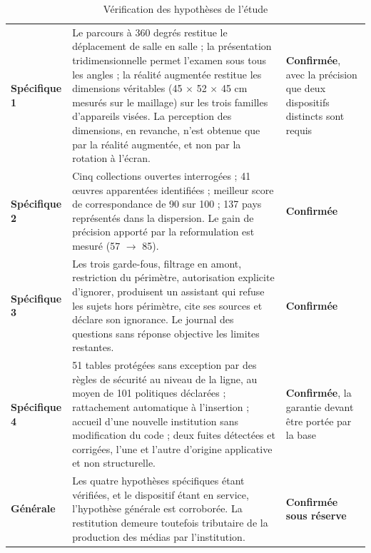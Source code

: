 \begin{table}[htbp]
\centering
\caption{Vérification des hypothèses de l'étude}
\label{tab:hypotheses}
\footnotesize
\begin{tabularx}{\textwidth}{|C{2.1cm}|X|C{2.6cm}|}
\hline
{}
 &  &  \\ \hline
\textbf{Spécifique 1} &
Le parcours à 360 degrés restitue le déplacement de salle en salle ; la
présentation tridimensionnelle permet l'examen sous tous les angles ; la réalité
augmentée restitue les dimensions véritables (45 $\times$ 52 $\times$ 45 cm
mesurés sur le maillage) sur les trois familles d'appareils visées. La
perception des dimensions, en revanche, n'est obtenue que par la réalité
augmentée, et non par la rotation à l'écran. &
\textbf{Confirmée}, avec la précision que deux dispositifs distincts sont
requis \\ \hline
\textbf{Spécifique 2} &
Cinq collections ouvertes interrogées ; 41 œuvres apparentées identifiées ;
meilleur score de correspondance de 90 sur 100 ; 137 pays représentés dans la
dispersion. Le gain de précision apporté par la reformulation est mesuré
(57 $\rightarrow$ 85). &
\textbf{Confirmée} \\ \hline
\textbf{Spécifique 3} &
Les trois garde-fous, filtrage en amont, restriction du périmètre, autorisation
explicite d'ignorer, produisent un assistant qui refuse les sujets hors
périmètre, cite ses sources et déclare son ignorance. Le journal des questions
sans réponse objective les limites restantes. &
\textbf{Confirmée} \\ \hline
\textbf{Spécifique 4} &
51 tables protégées sans exception par des règles de sécurité au niveau de la ligne, au moyen de 101 politiques déclarées ;
rattachement automatique à l'insertion ; accueil d'une nouvelle institution sans
modification du code ; deux fuites détectées et corrigées, l'une et l'autre
d'origine applicative et non structurelle. &
\textbf{Confirmée}, la garantie devant être portée par la base \\ \hline
\textbf{Générale} &
Les quatre hypothèses spécifiques étant vérifiées, et le dispositif étant en
service, l'hypothèse générale est corroborée. La restitution demeure toutefois
tributaire de la production des médias par l'institution. &
\textbf{Confirmée sous réserve} \\ \hline
\end{tabularx}
\end{table}

